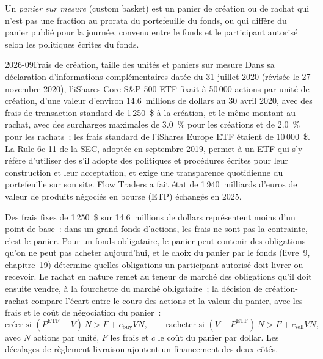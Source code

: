 \begin{definition}\label{def:hf:etf-market-making:custom}
Un \emph{panier sur mesure} (custom basket) est un panier de création ou de rachat qui n'est pas une fraction au prorata du portefeuille du fonds, ou qui diffère
du panier publié pour la journée, convenu entre le fonds et le participant autorisé selon les politiques écrites du fonds.
\end{definition}

\begin{dated}{2026-09}{Frais de création, taille des unités et paniers sur mesure}\label{dat:hf:etf-market-making:fees}
Dans sa déclaration d'informations complémentaires datée du 31 juillet 2020 (révisée le 27 novembre 2020), l'iShares Core S\&P 500 ETF fixait à 50\,000 actions par
unité de création, d'une valeur d'environ 14.6~millions de dollars au 30 avril 2020, avec des frais de transaction standard de 1\,250~\$ à la création, et le même montant au rachat, avec des
surcharges maximales de 3.0~\% pour les créations et de 2.0~\% pour les rachats~; les frais standard de l'iShares Europe ETF étaient de 10\,000~\$. La Rule 6c-11 de la SEC,
adoptée en septembre 2019, permet à un ETF qui s'y réfère d'utiliser des  s'il adopte des politiques et procédures écrites pour leur construction et
leur acceptation, et exige une transparence quotidienne du portefeuille sur son site. Flow Traders a fait état de 1\,940~milliards d'euros de valeur de produits négociés en bourse (ETP) échangés
en 2025.
\end{dated}

Des frais fixes de 1\,250~\$ sur 14.6~millions de dollars représentent moins d'un point de base~: dans un grand fonds d'actions, les frais ne sont pas la contrainte, c'est le panier. Pour un
fonds obligataire, le panier peut contenir des obligations qu'on ne peut pas acheter aujourd'hui, et le choix du panier par le fonds (livre~9, chapitre~19) détermine quelles obligations un
participant autorisé doit livrer ou recevoir. Le rachat en nature remet au teneur de marché des obligations qu'il doit ensuite vendre, à la
fourchette du marché obligataire~; la décision de création-rachat compare l'écart entre le cours des actions et la valeur du panier, avec les frais et le coût de négociation du panier~:
\[
\text{créer si } (P^{\mathrm{ETF}}-V)\,N>F+c_{\mathrm{buy}}VN,\qquad\text{racheter si } (V-P^{\mathrm{ETF}})\,N>F+c_{\mathrm{sell}}VN,
\]
avec $N$ actions par unité, $F$ les frais et $c$ le coût du panier par dollar. Les décalages de règlement-livraison ajoutent un financement des deux côtés.

